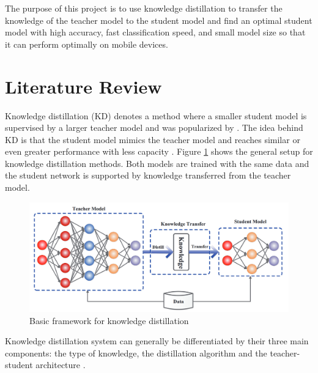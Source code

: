 \documentclass{article}
\begin{document}
The purpose of this project is to use knowledge distillation to transfer the knowledge of the teacher model to the student model and find an optimal student model with high accuracy, fast classification speed, and small model size so that it can perform optimally on mobile devices. 


\section{Literature Review}
Knowledge distillation (KD) denotes a method where a smaller student model is supervised by a larger teacher model and was popularized by \cite{hintonDistillingKnowledgeNeural2015}. The idea behind KD is that the student model mimics the teacher model and reaches similar or even greater performance with less capacity \cite{gouKnowledgeDistillationSurvey2021}. Figure \ref{fig:kd} shows the general setup for knowledge distillation methods. Both models are trained with the same data and the student network is supported by knowledge transferred from the teacher model.

\begin{figure}[htb]
	\begin{center}
		\includegraphics[width=150mm]{assets/kd}
	\end{center}
	\caption{Basic framework for knowledge distillation \cite{gouKnowledgeDistillationSurvey2021}}
	\label{fig:kd}
\end{figure}

Knowledge distillation system can generally be differentiated by their three main components: the type of knowledge, the distillation algorithm and the teacher-student architecture \cite{gouKnowledgeDistillationSurvey2021}.
\end{document}
